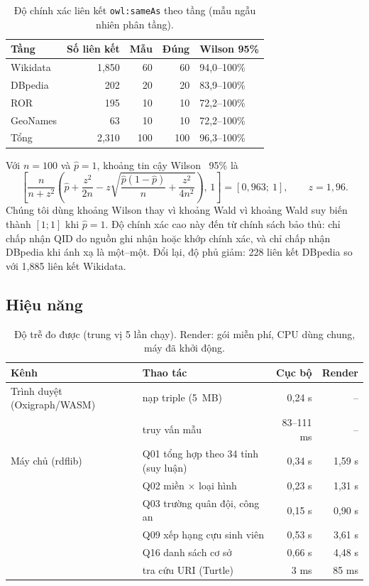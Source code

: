 \documentclass[12pt,a4paper]{article}
\begin{document}
\begin{table}[htbp]
\centering\small
\caption{Độ chính xác liên kết \texttt{owl:sameAs} theo tầng (mẫu ngẫu nhiên phân tầng).}\label{tab:precision}
\begin{tabular}{lrrrl}
\toprule
Tầng & Số liên kết & Mẫu & Đúng & Wilson 95\% \\
\midrule
Wikidata & 1{,}850 & 60 & 60 & 94,0--100\% \\
DBpedia  & 202 & 20 & 20 & 83,9--100\% \\
ROR      & 195 & 10 & 10 & 72,2--100\% \\
GeoNames & 63  & 10 & 10 & 72,2--100\% \\
\midrule
Tổng     & 2{,}310 & 100 & 100 & 96,3--100\% \\
\bottomrule
\end{tabular}
\end{table} Với \(n=100\) và
\(\hat p=1\), khoảng tin cậy Wilson~\cite{wilson1927} 95\% là
\[
\left[\frac{n}{n+z^2}\left(\hat p + \frac{z^2}{2n} - z\sqrt{\frac{\hat p(1-\hat p)}{n}+\frac{z^2}{4n^2}}\right),\,1\right]
= [0{,}963;\ 1],\qquad z=1{,}96 .
\]
Chúng tôi dùng khoảng Wilson thay vì khoảng Wald vì khoảng Wald suy biến thành \([1;1]\) khi \(\hat p = 1\). Độ chính
xác cao này đến từ chính sách bảo thủ: chỉ chấp nhận QID do nguồn ghi nhận hoặc khớp chính xác, và chỉ chấp nhận
DBpedia khi ánh xạ là một--một. Đổi lại, độ phủ giảm: 228 liên kết DBpedia so với 1{,}885 liên kết Wikidata.

\subsection{Hiệu năng}
\begin{table}[htbp]
\centering\small
\caption{Độ trễ đo được (trung vị 5 lần chạy). Render: gói miễn phí, CPU dùng chung, máy đã khởi động.}\label{tab:perf}
\begin{tabular}{llrr}
\toprule
Kênh & Thao tác & Cục bộ & Render \\
\midrule
Trình duyệt (Oxigraph/WASM) & nạp \metricUnionTriples{} triple (5~MB) & 0,24 s & -- \\
                            & truy vấn mẫu & 83--111 ms & -- \\
Máy chủ (rdflib)            & Q01 tổng hợp theo 34 tỉnh (suy luận) & 0,34 s & 1,59 s \\
                            & Q02 miền \(\times\) loại hình & 0,23 s & 1,31 s \\
                            & Q03 trường quân đội, công an & 0,15 s & 0,90 s \\
                            & Q09 xếp hạng cựu sinh viên & 0,53 s & 3,61 s \\
                            & Q16 danh sách cơ sở & 0,66 s & 4,48 s \\
                            & tra cứu URI (Turtle) & 3 ms & 85 ms \\
\bottomrule
\end{tabular}
\end{table}
\end{document}
